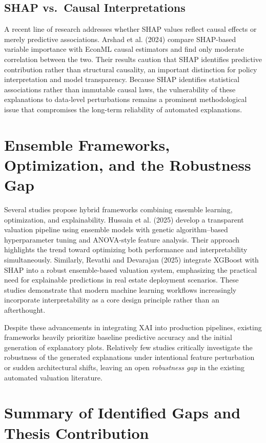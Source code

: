 \documentclass[12pt,a4paper,oneside,openany]{book}
\begin{document}
\subsection{SHAP vs.\ Causal Interpretations}

A recent line of research addresses whether SHAP values reflect causal effects or merely predictive associations. Arshad et al. (2024) compare SHAP-based variable importance with EconML causal estimators and find only moderate correlation between the two. Their results caution that SHAP identifies predictive contribution rather than structural causality, an important distinction for policy interpretation and model transparency. Because SHAP identifies statistical associations rather than immutable causal laws, the vulnerability of these explanations to data-level perturbations remains a prominent methodological issue that compromises the long-term reliability of automated explanations.

\section{Ensemble Frameworks, Optimization, and the Robustness Gap}

Several studies propose hybrid frameworks combining ensemble learning, optimization, and explainability. Hussain et al. (2025) develop a transparent valuation pipeline using ensemble models with genetic algorithm--based hyperparameter tuning and ANOVA-style feature analysis. Their approach highlights the trend toward optimizing both performance and interpretability simultaneously. Similarly, Revathi and Devarajan (2025) integrate XGBoost with SHAP into a robust ensemble-based valuation system, emphasizing the practical need for explainable predictions in real estate deployment scenarios. These studies demonstrate that modern machine learning workflows increasingly incorporate interpretability as a core design principle rather than an afterthought.

Despite these advancements in integrating XAI into production pipelines, existing frameworks heavily prioritize baseline predictive accuracy and the initial generation of explanatory plots. Relatively few studies critically investigate the robustness of the generated explanations under intentional feature perturbation or sudden architectural shifts, leaving an open \textit{robustness gap} in the existing automated valuation literature.

\section{Summary of Identified Gaps and Thesis Contribution}
\end{document}
